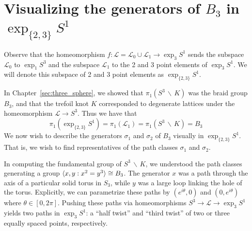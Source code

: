 \documentclass[12pt,twoside]{reedthesis}
\theoremstyle{definition}
\newcommand{\LS}{\mathcal{L}}
\newcommand{\exptwothree}{\exp_{\{2,3\}}}
\newcommand{\wo}{\, \backslash \,}
\DeclarePairedDelimiter\ang{\langle}{\rangle}
\begin{document}
\section{Visualizing the generators of $B_3$ in $\exptwothree S^1$}

Observe that the homeomorphism $f : \LS = \LS_0 \cup \LS_1 \to \exp_3 S^1$ sends the subspace $\LS_0 $ to $\exp_1 S^3$ and the subspace $\LS_1$ to the 2 and 3 point elements of $\exp_3 S^1$.
We will denote this subspace of 2 and 3 point elements as $\exptwothree S^1$.

In Chapter~\ref{sec:three_sphere}, we showed that $\pi_1(S^3 \wo K)$ was the braid group $B_3$, and that the trefoil knot $K$ corresponded to degenerate lattices under the homeomorphism $\LS \to S^3$.
Thus we have that
\begin{equation*}
  \pi_1(\exptwothree S^1) = \pi_1(\LS_1) = \pi_1(S^3 \wo K) = B_3
\end{equation*}
We now wish to describe the generators $\sigma_1$ and $\sigma_2$ of $B_3$ visually in $\exptwothree S^1$.
That is, we wish to find representatives of the path classes $\sigma_1$ and $\sigma_2$.

In computing the fundamental group of $S^3 \wo K$, we understood the path classes generating a group $\ang{x, y : x^2 = y^3} \cong B_3$.
The generator $x$ was a path through the axis of a particular solid torus in $S_3$, while $y$ was a large loop linking the hole of the torus.
Explicitly, we can parametrize these paths by $(e^{i \theta}, 0)$ and $(0, e^{i \theta})$ where $\theta \in [0, 2 \pi]$.
Pushing these paths via homeomorphisms $S^3 \to \LS \to \exp_3 S^1$ yields two paths in $\exp_3 S^1$: a ``half twist'' and ``third twist'' of two or three equally spaced points, respectively.
\end{document}
